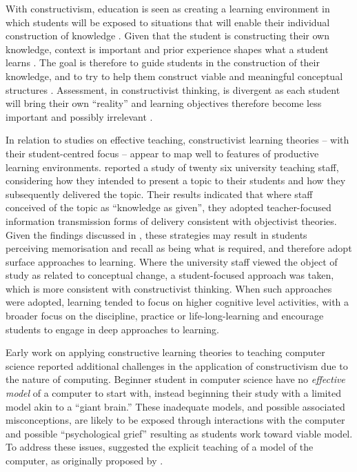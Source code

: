 With constructivism, education is seen as creating a learning environment in which students will be exposed to situations that will enable their individual construction of knowledge \cite{Jonassen:1991,Vrasidas:2000}. Given that the student is constructing their own knowledge, context is important and prior experience shapes what a student learns \cite{Jonassen:1991a}. The goal is therefore to guide students in the construction of their knowledge, and to try to help them construct viable and meaningful conceptual structures \cite{Jonassen:1991,Vrasidas:2000}. Assessment, in constructivist thinking, is divergent as each student will bring their own ``reality'' and learning objectives therefore become less important and possibly irrelevant \cite{Jonassen:1992}. 

In relation to studies on effective teaching, constructivist learning theories -- with their student-centred focus -- appear to map well to features of productive learning environments. \citet{Martin:2000} reported a study of twenty six university teaching staff, considering how they intended to present a topic to their students and how they subsequently delivered the topic. Their results indicated that where staff conceived of the topic as ``knowledge as given'', they adopted teacher-focused information transmission forms of delivery consistent with objectivist theories. Given the findings discussed in , these strategies may result in students perceiving memorisation and recall as being what is required, and therefore adopt surface approaches to learning. Where the university staff viewed the object of study as related to conceptual change, a student-focused approach was taken, which is more consistent with constructivist thinking. When such approaches were adopted, learning tended to focus on higher cognitive level activities, with a broader focus on the discipline, practice or life-long-learning and encourage students to engage in deep approaches to learning.


Early work on applying constructive learning theories to teaching computer science \cite{BenAri:1998,BenAri:2001} reported additional challenges in the application of constructivism due to the nature of computing. Beginner student in computer science have no \emph{effective model} of a computer to start with, instead beginning their study with a limited model akin to a ``giant brain.'' These inadequate models, and possible associated misconceptions, are likely to be exposed through interactions with the computer and possible ``psychological grief'' resulting as students work toward viable model. To address these issues, \citet{BenAri:1998,BenAri:2001} suggested the explicit teaching of a model of the computer, as originally proposed by \citet{DuBoulay:1986}. 

